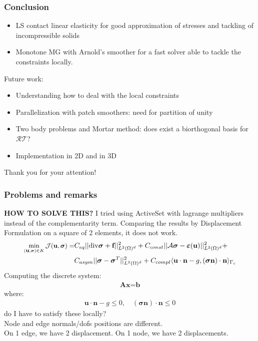 \documentclass[8pt, oneside]{beamer}   	%
\newcommand{\bA}{\textbf{A}}
\newcommand{\bb}{\textbf{b}}
\newcommand{\bff}{\textbf{f}}
\newcommand{\bn}{\textbf{n}}
\newcommand{\bu}{\textbf{u}}
\newcommand{\bbx}{\textbf{x}}
\newcommand{\bsigma}{\boldsymbol{\sigma}}
\newcommand{\RT}{\mathcal{RT}}
\begin{document}
\begin{frame}
\frametitle{\textbf{Conclusion}}
\begin{itemize}
\item LS contact linear elasticity for good approximation of stresses and tackling of incompressible solids
\item Monotone MG with Arnold's smoother for a fast solver able to tackle the constraints locally. 
\end{itemize}
Future work:
\begin{itemize}
\item Understanding how to deal with the local constraints
\item Parallelization with patch smoothers: need for partition of unity
\item Two body problems and Mortar method: does exist a biorthogonal basis for $\RT$?
\item Implementation in 2D and in 3D 
\end{itemize}
\end{frame}


\begin{frame}
\center
\LARGE
Thank you for your attention!
\end{frame}


\begin{frame}
\end{frame}


\begin{frame}
\frametitle{\textbf{Problems and remarks}}
\textbf{HOW TO SOLVE THIS?}
I tried using ActiveSet with lagrange multipliers instead of the complementarity term. Comparing the results by Displacement Formulation on a square of 2 elements, it does not work.
\begin{align*}
\small
\min \limits_{(\bu,\bsigma) \in  K}\mathcal{J}(\bu,\bsigma)=&C_{eq} ||\text{div} \bsigma+\bff||_{L^2(\Omega)^d}^2+C_{const}||\mathcal{A}\bsigma -\boldsymbol{\varepsilon}(\bu)||_{L^2(\Omega)^d}^2   +\\
&C_{asym}||\bsigma -\bsigma^T||_{L^2(\Omega)^d}^2 +C_{compl} \langle \bu \cdot \bn -g, (\bsigma \bn) \cdot \bn \rangle_{\Gamma_c}
\end{align*}
Computing the discrete system:
\begin{align*}
\bA \bbx = \bb
\end{align*}
where:
\begin{align*}
 \bu \cdot \bn - g  \leq 0, \quad  (\bsigma \bn) \cdot \bn \leq 0
\end{align*}
do I have to satisfy these locally? \\
Node and edge normals/dofs positions are different.\\
On 1 edge, we have 2 displacement. On 1 node, we have 2 displacements.
\end{frame}
\end{document}
